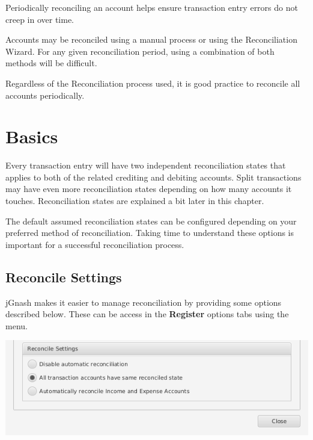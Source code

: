 \documentclass[letterpaper,12pt]{book}
\begin{document}
    Periodically reconciling an account helps ensure transaction entry errors do not creep in over time.


    Accounts may be reconciled using a manual process or using the Reconciliation Wizard.
    For any given reconciliation period, using a combination of both methods will be difficult.

    Regardless of the Reconciliation process used, it is good practice to reconcile all accounts periodically.

    \section{Basics}
    Every transaction entry will have two independent reconciliation states that applies to both of the related
    crediting and debiting accounts.
    Split transactions may have even more reconciliation states depending on how many accounts it touches.
    Reconciliation states are explained a bit later in this chapter.

    The default assumed reconciliation states can be configured depending on your preferred method of reconciliation.
    Taking time to understand these options is important for a successful reconciliation process.


    \subsection{Reconcile Settings}

    jGnash makes it easier to manage reconciliation by providing some options described below.
    These can be access in the \textbf{Register} options tabs using the  menu.

    \includegraphics[width=0.8\linewidth]{images/reconcile-options}
\end{document}

